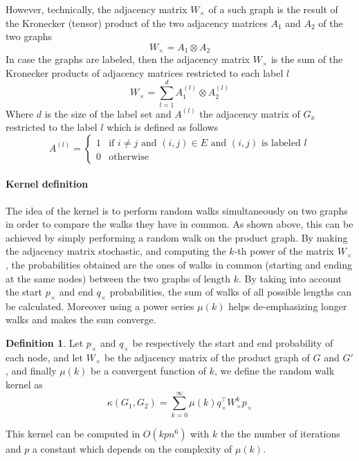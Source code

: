 \documentclass{article}
\theoremstyle{definition}
\newtheorem{definition}{Definition}
\begin{document}
However, technically, the adjacency matrix $W_{\times}$ of a such graph is the result of the Kronecker (tensor) product of the two adjacency matrices $A_1$ and $A_2$ of the two graphs \cite{weichsel1962kronecker}
\begin{equation}
    W_{\times}=A_1 \otimes A_{2}
\end{equation}
In case the graphs are labeled, then the adjacency matrix $W_{\times}$ is the sum of the Kronecker products of adjacency matrices restricted to each label $l$ 
\begin{equation}
	W_{\times}=\sum\limits_{l=1}^{d} A_1^{(l)} \otimes A_2^{(l)}
\end{equation}
Where $d$ is the size of the label set and $A^{(l)}$ the adjacency matrix of $G_x$ restricted to the label $l$ which is defined as follows
\begin{equation}
	A^{(l)}=\left\{
		\begin{matrix}
		1 & \mbox{if } i \neq j \mbox{ and } (i,j) \in E \mbox{ and } (i,j) \mbox{ is labeled } l\\
		0 & \mbox{otherwise}
		\end{matrix}
		\right.
\end{equation}

\paragraph{Kernel definition}
The idea of the kernel is to perform random walks simultaneously on two graphs in order to compare the walks they have in common. As shown above, this can be achieved by simply performing a random walk on the product graph.
By making the adjacency matrix stochastic, and computing the $k$-th power of the matrix $W_\times$, the probabilities obtained are the ones of walks in common (starting and ending at the same nodes) between the two graphs of length $k$.
By taking into account the start $p_\times$ and end $q_\times$ probabilities, the sum of walks of all possible lengths can be calculated. Moreover using a power series $\mu(k)$ helps de-emphasizing longer walks and makes the sum converge. 
\begin{definition}Let $p_{\times}$ and $q_{\times}$ be respectively the start and end probability of each node, and let $W_{\times}$ be the adjacency matrix of the product graph of $G$ and $G'$, and finally $\mu(k)$ be a convergent function of $k$, we define the random walk kernel as\cite{vishwanathan_graph_2010}
	\begin{equation}
		\kappa(G_1,G_2) = \sum\limits_{k=0}^{\infty}\mu(k)q_{\times}^{\top}W_{\times}^{k}p_{\times}
	\end{equation}
\end{definition}
\noindent
This kernel can be computed in $O(kpn^6)$ with $k$ the the number of iterations and $p$ a constant which depends on the complexity of $\mu(k)$.
\end{document}
